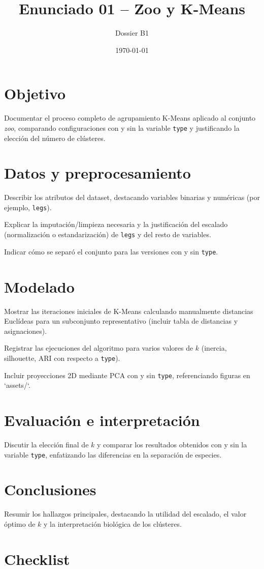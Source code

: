 \documentclass[12pt]{article}
\title{Enunciado 01 -- Zoo y K-Means}
\author{Dossier B1}
\date{\today}
\begin{document}
\maketitle
\section{Objetivo}
Documentar el proceso completo de agrupamiento K-Means aplicado al conjunto \emph{zoo}, comparando configuraciones con y sin la variable \texttt{type} y justificando la elección del número de clústeres.

\section{Datos y preprocesamiento}
\begin{pasoapaso}
  \item Describir los atributos del dataset, destacando variables binarias y numéricas (por ejemplo, \texttt{legs}).
  \item Explicar la imputación/limpieza necesaria y la justificación del escalado (normalización o estandarización) de \texttt{legs} y del resto de variables.
  \item Indicar cómo se separó el conjunto para las versiones con y sin \texttt{type}.
\end{pasoapaso}

\section{Modelado}
\begin{pasoapaso}
  \item Mostrar las iteraciones iniciales de K-Means calculando manualmente distancias Euclídeas para un subconjunto representativo (incluir tabla de distancias y asignaciones).
  \item Registrar las ejecuciones del algoritmo para varios valores de $k$ (inercia, silhouette, ARI con respecto a \texttt{type}).
  \item Incluir proyecciones 2D mediante PCA con y sin \texttt{type}, referenciando figuras en `assets/`.
\end{pasoapaso}

\section{Evaluación e interpretación}
Discutir la elección final de $k$ y comparar los resultados obtenidos con y sin la variable \texttt{type}, enfatizando las diferencias en la separación de especies.

\section{Conclusiones}
Resumir los hallazgos principales, destacando la utilidad del escalado, el valor óptimo de $k$ y la interpretación biológica de los clústeres.

\section*{Checklist}
\ChecklistBase
\end{document}
